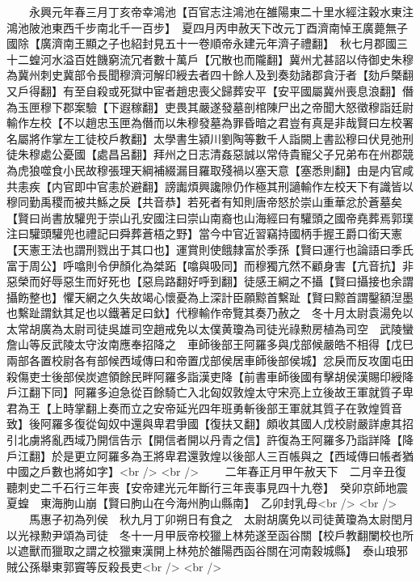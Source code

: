 　　永興元年春三月丁亥帝幸鴻池【百官志注鴻池在雒陽東二十里水經注穀水東注鴻池陂池東西千步南北千一百步】　夏四月丙申赦天下改元丁酉濟南悼王廣薨無子國除【廣濟南王顯之子也紹封見五十一卷順帝永建元年濟子禮翻】　秋七月郡國三十二蝗河水溢百姓饑窮流冗者數十萬戶【冗散也而隴翻】冀州尤甚詔以侍御史朱穆為冀州刺史冀部令長聞穆濟河解印綬去者四十餘人及到奏劾諸郡貪汙者【劾戶槩翻又戶得翻】有至自殺或死獄中宦者趙忠喪父歸葬安平【安平國屬冀州喪息浪翻】僭為玉匣穆下郡案驗【下遐稼翻】吏畏其嚴遂發墓剖棺陳尸出之帝聞大怒徵穆詣廷尉輸作左校【不以趙忠玉匣為僭而以朱穆發墓為罪昏暗之君豈有真是非哉賢曰左校署名屬將作掌左工徒校戶教翻】太學書生潁川劉陶等數千人詣闕上書訟穆曰伏見弛刑徒朱穆處公憂國【處昌呂翻】拜州之日志清姦惡誠以常侍貴寵父子兄弟布在州郡競為虎狼噬食小民故穆張理天綱補綴漏目羅取殘禍以塞天意【塞悉則翻】由是内官咸共恚疾【内官即中官恚於避翻】謗讟煩興讒隙仍作極其刑讁輸作左校天下有識皆以穆同勤禹稷而被共鯀之戾【共音恭】若死者有知則唐帝怒於崇山重華忿於蒼墓矣【賢曰尚書放驩兜于崇山孔安國注曰崇山南裔也山海經曰有驩頭之國帝堯葬焉郭璞注曰驩頭驩兜也禮記曰舜葬蒼梧之野】當今中官近習竊持國柄手握王爵口銜天憲【天憲王法也謂刑戮出于其口也】運賞則使餓隸富於季孫【賢曰運行也論語曰季氏富于周公】呼噏則令伊顏化為桀跖【噏與吸同】而穆獨亢然不顧身害【亢音抗】非惡榮而好辱惡生而好死也【惡烏路翻好呼到翻】徒感王綱之不攝【賢曰攝接也余謂攝飭整也】懼天網之久失故竭心懷憂為上深計臣願黥首繫趾【賢曰黥首謂鑿額湼墨也繫趾謂釱其足也以鐵著足曰釱】代穆輸作帝覽其奏乃赦之　冬十月太尉袁湯免以太常胡廣為太尉司徒吳雄司空趙戒免以太僕黄瓊為司徒光祿勲房植為司空　武陵蠻詹山等反武陵太守汝南應奉招降之　車師後部王阿羅多與戊部候嚴皓不相得【戊巳兩部各置校尉各有部候西域傳曰和帝置戊部侯居車師後部侯城】忿戾而反攻圍屯田殺傷吏士後部侯炭遮領餘民畔阿羅多詣漢吏降【前書車師後國有擊胡侯漢賜印綬降戶江翻下同】阿羅多迫急從百餘騎亡入北匈奴敦煌太守宋亮上立後故王軍就質子卑君為王【上時掌翻上奏而立之安帝延光四年班勇斬後部王軍就其質子在敦煌質音致】後阿羅多復從匈奴中還與卑君爭國【復扶又翻】頗收其國人戊校尉嚴詳慮其招引北虜將亂西域乃開信告示【開信者開以丹青之信】許復為王阿羅多乃詣詳降【降戶江翻】於是更立阿羅多為王將卑君還敦煌以後部人三百帳與之【西域傳曰帳者猶中國之戶數也將如字】<br />
<br />
　　二年春正月甲午赦天下　二月辛丑復聽刺史二千石行三年喪【安帝建光元年斷行三年喪事見四十九卷】　癸卯京師地震夏蝗　東海朐山崩【賢曰朐山在今海州朐山縣南】　乙卯封乳母<br />
<br />
　　馬惠子初為列侯　秋九月丁卯朔日有食之　太尉胡廣免以司徒黄瓊為太尉閏月以光禄勲尹頌為司徒　冬十一月甲辰帝校獵上林苑遂至函谷關【校戶教翻闌校也所以遮獸而獵取之謂之校獵東漢開上林苑於雒陽西函谷關在河南穀城縣】　泰山琅邪賊公孫舉東郭竇等反殺長吏<br />
<br />
